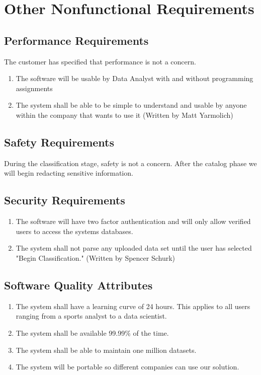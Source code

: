\documentclass[12pt,oneside,letterpaper]{article}
\begin{document}
\section{Other Nonfunctional Requirements}
\subsection{Performance Requirements}
The customer has specified that performance is not a concern.
\begin{enumerate}
    \item The software will be usable by Data Analyst with and without programming assignments
    \item The system shall be able to be simple to understand and usable by anyone within the company that wants to use it (Written by Matt Yarmolich)
\end{enumerate}
\subsection{Safety Requirements}
During the classification stage, safety is not a concern. After the catalog phase we will begin redacting sensitive information.
\subsection{Security Requirements}
\begin{enumerate}
    \item The software will have two factor authentication and will only allow verified users to access the systems databases.
    \item The system shall not parse any uploaded data set until the user has selected "Begin Classification." (Written by Spencer Schurk)
\end{enumerate}
\subsection{Software Quality Attributes}
\begin{enumerate}
    \item The system shall have a learning curve of 24 hours. This applies to all users ranging from a sports analyst to a data scientist.
    \item The system shall be available 99.99\% of the time.
    \item The system shall be able to maintain one million datasets.
    \item The system will be portable so different companies can use our solution.
\end{enumerate}
\end{document}

